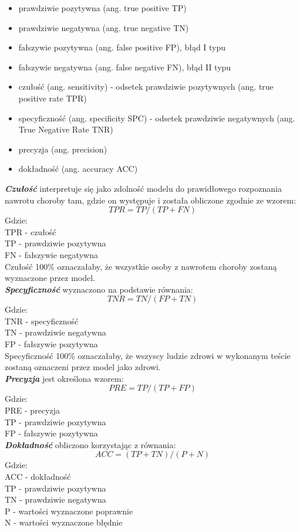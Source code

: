 \begin{itemize}
\item prawdziwie pozytywna (ang. true positive TP)
\item prawdziwie negatywna (ang. true negative TN)
\item fałszywie pozytywna (ang. false positive FP), błąd I typu
\item fałszywie negatywna (ang. false negative FN), błąd II typu
\item czułość (ang. sensitivity) - odsetek prawdziwie pozytywnych (ang. true positive rate TPR)
\item specyficzność (ang. specificity SPC) - odsetek prawdziwie negatywnych (ang. True Negative Rate TNR)
\item precyzja (ang. precision)
\item dokładność (ang. accuracy ACC)
\end{itemize}
\vspace{5mm}
\textbf{\textit{Czułość}}  interpretuje się jako zdolność modelu do prawidłowego rozpoznania nawrotu choroby tam, gdzie on występuje i została obliczone zgodnie ze wzorem:
$$ TPR = TP/(TP+FN) $$
Gdzie:\\
TPR - czułość\\
TP -  prawdziwie pozytywna\\
FN - fałszywie negatywna\\
Czułość 100\% oznaczałaby, że wszystkie osoby z nawrotem choroby zostaną wyznaczone przez model.\\
\vspace{5mm}
\textbf{\textit{Specyficzność}} wyznaczono na podstawie równania:
$$ TNR = TN/(FP+TN) $$
Gdzie:\\
TNR - specyficzność \\
TN - prawdziwie negatywna\\
FP - fałszywie pozytywna\\
Specyficzność 100\% oznaczałaby, że wszyscy ludzie zdrowi w wykonanym teście  zostaną oznaczeni przez model jako zdrowi.\\

\textbf{\textit{Precyzja}} jest określona wzorem:
$$ PRE = TP/(TP+FP) $$
Gdzie:\\
PRE - precyzja\\
TP -  prawdziwie pozytywna\\
FP -  fałszywie pozytywna\\

\textbf{\textit{Dokładność}} obliczono korzystając z równania:
$$ ACC = (TP+TN)/(P+N) $$
Gdzie:\\
ACC -  dokładność\\
TP -  prawdziwie pozytywna\\
TN -  prawdziwie negatywna\\
P -  wartości wyznaczone poprawnie\\
N -  wartości wyznaczone błędnie\\

